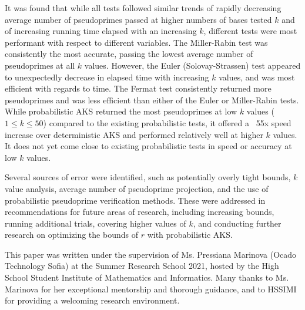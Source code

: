 \documentclass{article}
\begin{document}
It was found that while all tests followed similar trends of rapidly decreasing average number of pseudoprimes passed at higher numbers of bases tested $k$ and of increasing running time elapsed with an increasing $k$, different tests were most performant with respect to different variables. The Miller-Rabin test was consistently the most accurate, passing the lowest average number of pseudoprimes at all $k$ values. However, the Euler (Solovay-Strassen) test appeared to unexpectedly decrease in elapsed time with increasing $k$ values, and was most efficient with regards to time. The Fermat test consistently returned more pseudoprimes and was less efficient than either of the Euler or Miller-Rabin tests. While probabilistic AKS returned the most pseudoprimes at low $k$ values ($1 \leq k \leq 50$) compared to the existing probabilistic tests, it offered a ~55x speed increase over deterministic AKS and performed relatively well at higher $k$ values. It does not yet come close to existing probabilistic tests in speed or accuracy at low $k$ values.

Several sources of error were identified, such as potentially overly tight bounds, $k$ value analysis, average number of pseudoprime projection, and the use of probabilistic pseudoprime verification methods. These were addressed in recommendations for future areas of research, including increasing bounds, running additional trials, covering higher values of $k$, and conducting further research on optimizing the bounds of $r$ with probabilistic AKS.

This paper was written under the supervision of Ms. Pressiana Marinova (Ocado Technology Sofia) at the Summer Research School 2021, hosted by the High School Student Institute of Mathematics and Informatics. Many thanks to Ms. Marinova for her exceptional mentorship and thorough guidance, and to HSSIMI for providing a welcoming research environment.

\newpage
\nocite{*}


\end{document}
